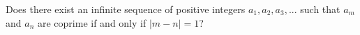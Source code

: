 Does there exist an infinite sequence of positive integers $a_1, a_2, a_3, . . .$  such that $a_m$ and $a_n$ are coprime if and only if $|m - n| = 1$?
